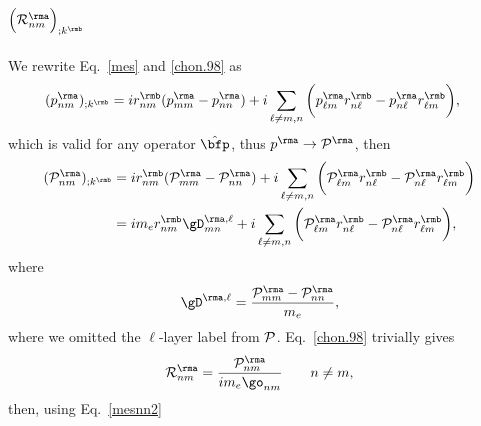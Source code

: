 \chapter{$\Big({\cal R}^\rma_{nm}\Big)_{;k^\rmb}$}\label{calr}

 
We rewrite Eq.~\eqref{mes} and \eqref{chon.98} as
\begin{align}\label{mesnn}
(p^{\rma}_{nm})_{;k^{\rmb}}&= 
i 
r^{\rmb}_{nm}
(p^\rma_{mm}-p^\rma_{nn})
+i
\sum_{\ell\neq m,n}
\bigg( 
p^{\rma}_{\ell m}
 r^{\rmb}_{n\ell}
- 
p^{\rma}_{n\ell} 
r^{\rmb}_{\ell m}
\bigg)
,
\end{align} 
which is valid for any operator $\hat \bfp$, thus $p^\rma\to{\cal
  P}^\rma$, then
\begin{align}\label{mesnn2}
({\cal P}^{\rma}_{nm})_{;k^{\rmb}}
&=
i
r^{\rmb}_{nm}
({\cal P}^\rma_{mm}-{\cal P}^\rma_{nn})
+i
\sum_{\ell\neq m,n}
\bigg(
{\cal P}^{\rma}_{\ell m}
 r^{\rmb}_{n\ell}
-
{\cal P}^{\rma}_{n\ell}
r^{\rmb}_{\ell m}
\bigg)
\nonumber\\
&=
im_e
r^{\rmb}_{nm}
\gD^{\rma,\ell}_{mn}
+i
\sum_{\ell\neq m,n}
\bigg(
{\cal P}^{\rma}_{\ell m}
 r^{\rmb}_{n\ell}
-
{\cal P}^{\rma}_{n\ell}
r^{\rmb}_{\ell m}
\bigg)
,
\end{align}
where
\begin{equation}\label{l12}
\gD^{\rma,\ell}
=\frac{{\cal P}^\rma_{mm}-{\cal P}^\rma_{nn}}{m_e}
,
\end{equation}
where we omitted the $\ell$-layer label from ${\cal P}$. 
Eq.~\eqref{chon.98} trivially gives
\begin{equation}\label{rnmenm69}
{\cal R}^\rma_{nm}=\frac{{\cal P}^\rma_{nm}}{im_e\go_{nm}}
\quad\quad n\ne m
,
\end{equation} 
then, using Eq.~\eqref{mesnn2}
